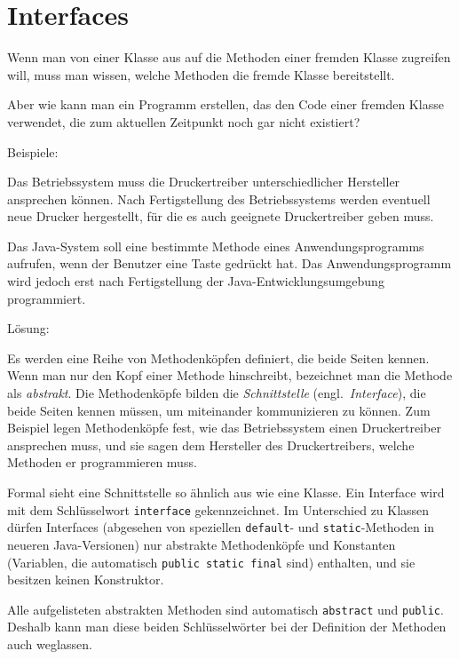 \section{Interfaces}

Wenn man von einer Klasse aus auf die Methoden einer fremden Klasse zugreifen
will, muss man wissen, welche Methoden die fremde Klasse bereitstellt.

Aber wie kann man ein Programm erstellen, das den Code einer fremden Klasse
verwendet, die zum aktuellen Zeitpunkt noch gar nicht existiert?

Beispiele:

\begin{compactitem}
\item Das Betriebssystem muss die Druckertreiber unterschiedlicher Hersteller
ansprechen können. Nach Fertigstellung des Betriebssystems werden eventuell
neue Drucker hergestellt, für die es auch geeignete Druckertreiber geben muss.

\item Das Java-System soll eine bestimmte Methode eines Anwendungsprogramms
aufrufen, wenn der Benutzer eine Taste gedrückt hat. Das Anwendungsprogramm wird
jedoch erst nach Fertigstellung der Java-Entwicklungsumgebung programmiert.
\end{compactitem}

Lösung:

Es werden eine Reihe von Methodenköpfen definiert, die beide Seiten kennen.
Wenn man nur den Kopf einer Methode hinschreibt, bezeichnet man die Methode als
\emph{abstrakt}. Die Methodenköpfe bilden die \emph{Schnittstelle} (engl.\
\emph{Interface}), die beide Seiten kennen müssen, um miteinander
kommunizieren zu können. Zum Beispiel legen Methodenköpfe fest, wie das
Betriebssystem einen Druckertreiber ansprechen muss, und sie sagen dem
Hersteller des Druckertreibers, welche Methoden er programmieren muss.

Formal sieht eine Schnittstelle so ähnlich aus wie eine Klasse. Ein Interface
wird mit dem Schlüsselwort \lstinline|interface| gekennzeichnet. Im Unterschied
zu Klassen dürfen Interfaces (abgesehen von speziellen \lstinline|default|- und
\lstinline|static|-Methoden in neueren Java-Versionen) nur abstrakte
Methodenköpfe und Konstanten (Variablen, die automatisch \lstinline|public static final|
sind) enthalten, und sie besitzen keinen Konstruktor.

Alle aufgelisteten abstrakten Methoden sind automatisch \lstinline|abstract|
und \lstinline|public|. Deshalb kann man diese beiden Schlüsselwörter bei der
Definition der Methoden auch weglassen.

